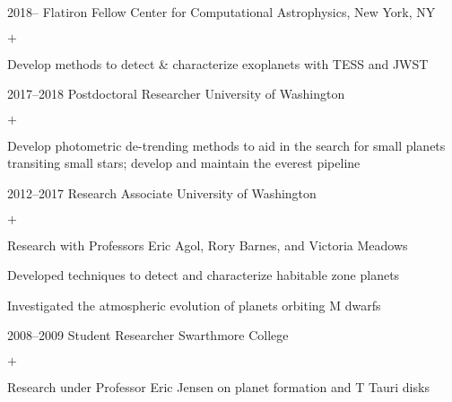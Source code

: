\documentclass[]{luger-cv} %
\begin{document}
\begin{entrylist}


\entry
{2018--}
{Flatiron Fellow}
{Center for Computational Astrophysics, New York, NY}
{%
\vspace{-1em}
\begin{list}{$+$}{\cvlist}
\item Develop methods to detect \& characterize exoplanets with TESS and JWST
\end{list}
}


\entry
{2017--2018}
{Postdoctoral Researcher}
{University of Washington}
{%
\vspace{-1em}
\begin{list}{$+$}{\cvlist}
\item Develop photometric de-trending methods to aid in the search for small
      planets transiting small stars; develop and maintain the everest pipeline
\end{list}
}


\entry
{2012--2017}
{Research Associate}
{University of Washington}
{%
\vspace{-1em}
\begin{list}{$+$}{\cvlist}
\ifdefined \onepage \else
\item Research with Professors Eric Agol, Rory Barnes, and Victoria Meadows
\fi
\item Developed techniques to detect and characterize habitable
zone planets
\item Investigated the atmospheric evolution of planets orbiting M dwarfs
\end{list}
}


\ifdefined \onepage \else
\entry
{2008--2009}
{Student Researcher}
{Swarthmore College}
{%
\vspace{-1em}
\begin{list}{$+$}{\cvlist}
\item Research under Professor Eric Jensen on planet formation and T Tauri disks
\end{list}
}
\fi


\end{entrylist}
\end{document}
